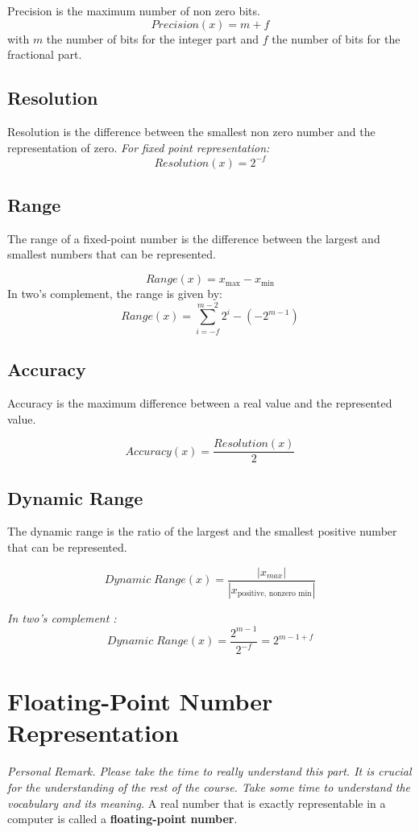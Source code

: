 \documentclass[12pt,openany]{book}
\begin{document}
			      	Precision is the maximum number of non zero bits.
			      	$$Precision(x) = m + f$$ with \(m\) the number of bits for the integer part and \(f\) the number of bits for the fractional part.
			      	
			      	\subsection{Resolution}
					Resolution is the difference between the smallest non zero number and the representation of zero.			
					\newline \textit{For fixed point representation:}      	
			      	$$Resolution(x) = 2^{-f}$$
			      	
			      	
			      	\subsection{Range}
			      	The range of a fixed-point number is the difference between the largest and smallest numbers that can be represented.
			      	
			      	\[Range(x) = x_{\text{max}} - x_{\text{min}}\]
			      	\newblock
			      	\newline
			      	In two's complement, the range is given by:
			      	\[ Range(x) = \displaystyle\sum_{i=-f}^{m-2} 2^i - \left( -2^{m-1} \right)\]
			      	
			      	\subsection{Accuracy}
			      	Accuracy is the maximum difference between a real value and the represented value.
			      	
			      	$$Accuracy(x) = \frac{Resolution(x)}{2}$$
			      	
			      	\subsection{Dynamic Range}
			      	The dynamic range is the ratio of the largest and the smallest positive number that can be represented.
			      	
			      	$$Dynamic \; Range(x) = \frac{|x_{max}|}{|x_{\text{positive, nonzero min}}|}$$
			      	
			      	\textit{In two's complement :}
			      	$$Dynamic \; Range(x) = \frac{2^{m-1}}{2^{-f}} = 2^{m-1+f}$$
			      	
			      	\section{Floating-Point Number Representation}
			      	\textit{Personal Remark. Please take the time to really understand this part. It is crucial for the understanding of the rest of the course. Take some time to understand the vocabulary and its meaning.}\newline
			      	\vskip 0.5cm
			      	A real number that is exactly representable in a computer is called a \textbf{floating-point number}. 
\end{document}
